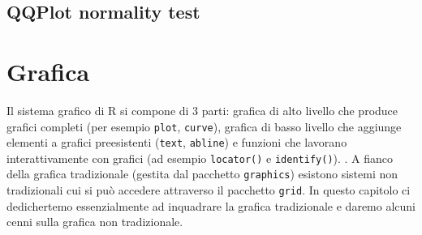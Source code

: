 \documentclass[onecolumn,11pt]{book}
\begin{document}
\section{QQPlot normality test}
\chapter{Grafica}
Il sistema grafico di \textsf{R} si compone di 3 parti: grafica di alto livello che produce grafici completi (per esempio \texttt{plot}, \texttt{curve}), grafica di basso livello che aggiunge elementi a grafici preesistenti (\texttt{text}, \texttt{abline}) e funzioni che lavorano interattivamente con grafici (ad esempio \texttt{locator()} e \texttt{identify()}).
 \cite{murrell}. 
A fianco della grafica tradizionale (gestita dal pacchetto \texttt{graphics}) esistono sistemi non tradizionali cui si pu\`o accedere attraverso il pacchetto \texttt{grid}. 
In questo capitolo ci dedichertemo essenzialmente ad inquadrare la grafica tradizionale e daremo alcuni cenni sulla grafica non tradizionale.
\end{document}
